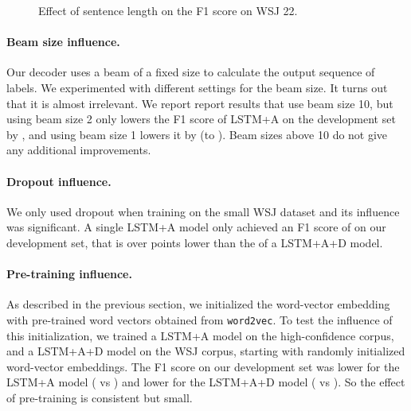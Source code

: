 \documentclass{article} \usepackage{nips15submit_e,times}
\begin{document}
\begin{figure}[h]
 \caption{Effect of sentence length on the F1 score on WSJ 22.}
\label{fig:len}
\end{figure}

\paragraph{Beam size influence.}
Our decoder uses a beam of a fixed size to calculate the output sequence of
labels. We experimented with different settings for the beam size. It turns
out that it is almost irrelevant. We report report results that use beam size
10, but using beam size 2 only lowers the F1 score of LSTM+A on the
development set by , and using beam size 1 lowers it by 
(to ). Beam sizes above 10 do not give any additional improvements.

\paragraph{Dropout influence.}
We only used dropout when training on the small WSJ dataset and its
influence was significant. A single LSTM+A model only achieved
an F1 score of  on our development set, that is over  points
lower than the  of a LSTM+A+D model.

\paragraph{Pre-training influence.}
As described in the previous section, we initialized the word-vector
embedding with pre-trained word vectors obtained from \texttt{word2vec}.
To test the influence of this initialization, we trained a LSTM+A model
on the high-confidence corpus, and a LSTM+A+D model on the WSJ corpus,
starting with randomly initialized word-vector embeddings.
The F1 score on our development set was  lower for the LSTM+A model
( vs ) and  lower for the LSTM+A+D model ( vs ).
So the effect of pre-training is consistent but small.
\end{document}
